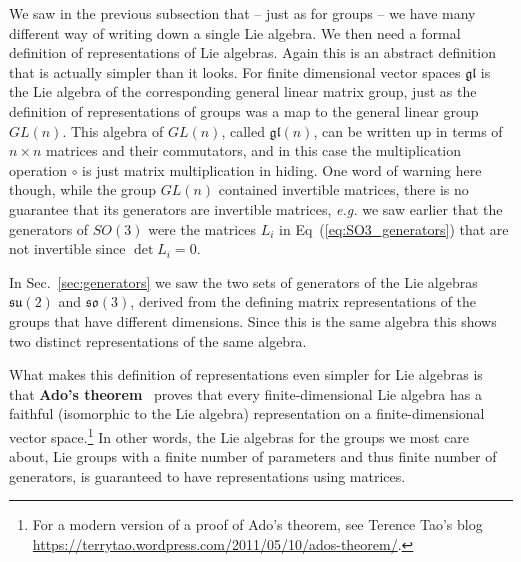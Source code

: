 \documentclass[notes.tex]{subfiles}
\begin{document}
We saw in the previous subsection that -- just as for groups -- we have many different way of writing down a single Lie algebra. We then need a formal definition of representations of Lie algebras.
Again this is an abstract definition that is actually simpler than it looks. For finite dimensional vector spaces $\mathfrak{gl}$ is the Lie algebra of the corresponding general linear matrix group, just as the definition of representations of groups was a map to the general linear group $GL(n)$. This algebra of $GL(n)$, called $\mathfrak{gl}(n)$, can be written up in terms of $n\times n$ matrices and their commutators, and in this case the multiplication operation $\circ$ is just matrix multiplication in hiding. One word of warning here though, while the group $GL(n)$ contained invertible matrices, there is no guarantee that its generators are invertible matrices, {\it e.g.} we saw earlier that the generators of $SO(3)$ were the matrices $L_i$ in Eq~(\ref{eq:SO3_generators}) that are not invertible since $\det L_i=0$.

In Sec.~\ref{sec:generators} we saw the two sets of generators of the Lie algebras $\mathfrak{su(2)}$ and $\mathfrak{so(3)}$, derived from the defining matrix representations of the groups that have different dimensions. Since this is the same algebra this shows two distinct representations of the same algebra. 

What makes this definition of representations even simpler for Lie algebras is that {\bf Ado's theorem}~\cite{Ado:1935} proves that every finite-dimensional Lie algebra has a faithful (isomorphic to the Lie algebra) representation on a finite-dimensional vector space.\footnote{For a modern version of a proof of Ado's theorem, see Terence Tao's blog \url{https://terrytao.wordpress.com/2011/05/10/ados-theorem/}.} In other words, the Lie algebras for the groups we most care about, Lie groups with a finite number of parameters and thus finite number of generators, is guaranteed to have representations using matrices.
\end{document}
